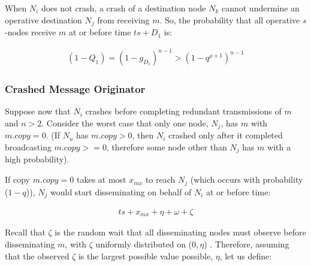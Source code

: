 When $N_i$ does not crash, a crash of a destination node $N_{k}$ cannot undermine an operative destination $N_{j}$ from receiving $m$. So, the probability that all operative $s$-nodes receive $m$ at or before time $ts +D_1$ is:

        \begin{equation*}
            \begin{aligned}
                (1-Q_1)=(1-g_{D_1})^{n-1}>(1-q^{\rho+1})^{n-1}
            \end{aligned}
        \end{equation*}


        \clearpage
        \subsubsection*{Crashed Message Originator}
Suppose now that $N_i$ crashes before completing redundant transmissions of $m$ and $n>2$. Consider the worst case that only one node, $N_j$, has $m$ with $m.copy=0$. (If $N_u$ has $m.copy>0$, then $N_i$ crashed only after it completed broadcasting $m.copy >= 0$, therefore some node other than $N_j$ has $m$ with a high probability).

If copy $m.copy = 0$ takes at most $x_{mx}$ to reach $N_j$ (which occurs with probability ($1-q$)), $N_j$ would start disseminating on behalf of $N_i$ at or before time:
        
        \begin{equation*}
            \begin{aligned}
                ts+ x_{mx} + \eta + \omega +\zeta
            \end{aligned}
        \end{equation*}
        
Recall that $\zeta$ is the random wait that all disseminating nodes must observe before disseminating $m$, with $\zeta$ uniformly distributed on ($0, \eta$) .  Therefore, assuming that the observed $\zeta$ is the largest possible value possible, $\eta$, let us define: 

